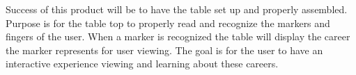 Success of this product will be to have the table set up and properly assembled. Purpose is for the table top to properly read and recognize the markers and fingers of the user. When a marker is recognized the table will display the career the marker represents for user viewing. The goal is for the user to have an interactive experience viewing and learning about these careers. 
